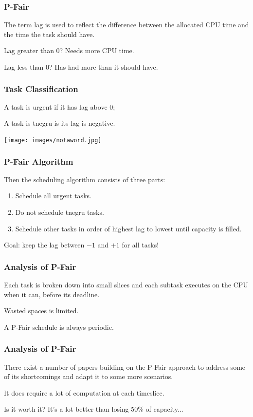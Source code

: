 \begin{frame}
\frametitle{P-Fair}

The term \alert{lag} is used to reflect the difference between the allocated CPU time and the time the task should have.

Lag greater than 0? Needs more CPU time.

Lag less than 0? Has had more than it should have.

\end{frame}

\begin{frame}
\frametitle{Task Classification}

A task is \alert{urgent} if it has lag above 0;

A task is \alert{tnegru} is its lag is negative.

\begin{center}
	\texttt{[image: images/notaword.jpg]}
\end{center}

\end{frame}

\begin{frame}
\frametitle{P-Fair Algorithm}

Then the scheduling algorithm consists of three parts:
\begin{enumerate}
	\item Schedule all urgent tasks.
	\item Do not schedule tnegru tasks.
	\item Schedule other tasks in order of highest lag to lowest until capacity is filled.
\end{enumerate}

Goal: keep the lag between $-1$ and $+1$ for all tasks!

\end{frame}

\begin{frame}
\frametitle{Analysis of P-Fair}

Each task is broken down into small slices and each subtask executes on the CPU when it can, before its deadline.

Wasted spaces is limited.

A P-Fair schedule is always periodic.

\end{frame}

\begin{frame}
\frametitle{Analysis of P-Fair}

There exist a number of papers building on the P-Fair approach to address some of its shortcomings and adapt it to some more scenarios.

It does require a lot of computation at each timeslice.

Is it worth it? It's a lot better than losing 50\% of capacity...

\end{frame}



